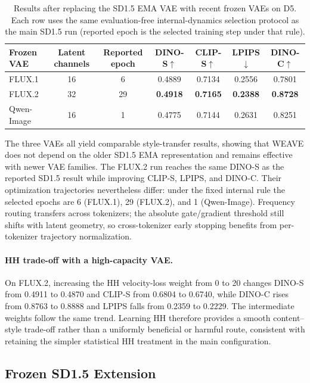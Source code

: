 \documentclass[letterpaper]{article}
\begin{document}
\begin{table}[t]
\centering
\small
\setlength{\tabcolsep}{5pt}
\begin{tabular}{@{}lcccccc@{}}
\toprule
Frozen VAE & Latent channels & Reported epoch & DINO-S$\uparrow$ & CLIP-S$\uparrow$ & LPIPS$\downarrow$ & DINO-C$\uparrow$ \\
\midrule
FLUX.1 & 16 & 6 & 0.4889 & 0.7134 & 0.2556 & 0.7801 \\
FLUX.2 & 32 & 29 & \textbf{0.4918} & \textbf{0.7165} & \textbf{0.2388} & \textbf{0.8728} \\
Qwen-Image & 16 & 1 & 0.4775 & 0.7144 & 0.2631 & 0.8251 \\
\bottomrule
\end{tabular}
\caption{Results after replacing the SD1.5 EMA VAE with recent frozen VAEs on D5. Each row
uses the same evaluation-free internal-dynamics selection protocol as the main SD1.5 run
(reported epoch is the selected training step under that rule).}
\label{tab:supp-vae-portability}
\end{table}

The three VAEs all yield comparable style-transfer results, showing that WEAVE does not
depend on the older SD1.5 EMA representation and remains effective with newer VAE families.
The FLUX.2 run reaches the same DINO-S as the reported SD1.5 result while improving CLIP-S,
LPIPS, and DINO-C. Their optimization trajectories nevertheless differ: under the fixed
internal rule the selected epochs are 6 (FLUX.1), 29 (FLUX.2), and 1 (Qwen-Image). Frequency
routing transfers across tokenizers; the absolute gate/gradient threshold still shifts with
latent geometry, so cross-tokenizer early stopping benefits from per-tokenizer trajectory
normalization.

\paragraph{HH trade-off with a high-capacity VAE.}
On FLUX.2, increasing the HH velocity-loss weight from 0 to 20 changes DINO-S from 0.4911
to 0.4870 and CLIP-S from 0.6804 to 0.6740, while DINO-C rises from 0.8763 to 0.8888 and
LPIPS falls from 0.2359 to 0.2229. The intermediate weights follow the same trend. Learning
HH therefore provides a smooth content--style trade-off rather than a uniformly beneficial
or harmful route, consistent with retaining the simpler statistical HH treatment in the
main configuration.

\subsection{Frozen SD1.5 Extension}
\end{document}

